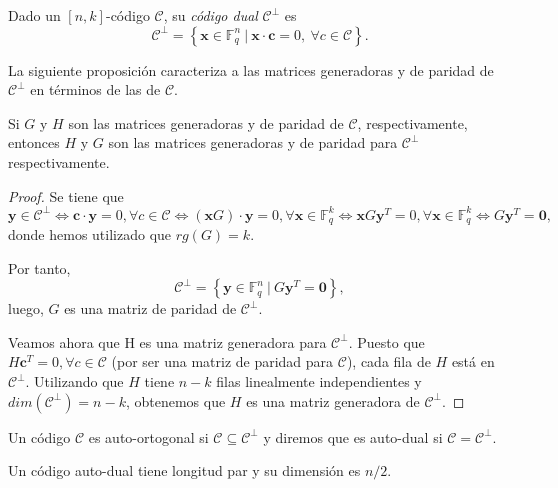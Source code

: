 \begin{definicion}
Dado un $[n,k]$-código $\mathcal{C}$, su \emph{código dual} $\mathcal{C}^{\bot}$ es
$$\mathcal{C}^{\bot} = \left\{ \mathbf{x} \in \mathds{F}_{q}^{n} \ \vert \ \mathbf{x} \cdot \mathbf{c} = 0, \ \forall c \in \mathcal{C} \right\}. $$ 
\end{definicion}

La siguiente proposición caracteriza a las matrices generadoras y de paridad de $\mathcal{C}^{\bot}$ en términos de las de $\mathcal{C}$.

\begin{proposicion}
Si $G$ y $H$ son las matrices generadoras y de paridad de $\mathcal{C}$, respectivamente, entonces $H$ y $G$ son las matrices generadoras y de paridad para $\mathcal{C}^{\bot}$ respectivamente.
\end{proposicion}

\begin{proof}
Se tiene que $$\mathbf{y} \in \mathcal{C}^{\bot} \Leftrightarrow  \mathbf{c} \cdot \mathbf{y} = 0, \forall c \in \mathcal{C} 
\Leftrightarrow (\mathbf{x}G) \cdot \mathbf{y} = 0, \forall \mathbf{x} \in \mathds{F}_{q}^{k} \Leftrightarrow \mathbf{x}G\mathbf{y}^T = 0, \forall \mathbf{x} \in \mathds{F}_{q}^{k} \Leftrightarrow G\mathbf{y}^T = \mathbf{0},$$ donde hemos utilizado que $rg(G) = k$.

Por tanto, $$\mathcal{C}^{\bot} = \left\{ \mathbf{y} \in \mathds{F}_{q}^{n} \ \vert \ G\mathbf{y}^T=\mathbf{0} \right\},$$ luego, $G$ es una matriz de paridad de $\mathcal{C}^{\bot}$.

Veamos ahora que H es una matriz generadora para $\mathcal{C}^{\bot}$. Puesto que $H\mathbf{c}^T = 0,  \forall c \in \mathcal{C}$ (por ser una matriz de paridad para $\mathcal{C}$), cada fila de $H$ está en $\mathcal{C}^{\bot}$. Utilizando que $H$ tiene $n-k$ filas linealmente independientes y $dim(\mathcal{C}^{\bot}) = n-k$, obtenemos que $H$ es una matriz generadora de $\mathcal{C}^{\bot}$.
\end{proof}

\begin{definicion}
Un código $\mathcal{C}$ es auto-ortogonal si $\mathcal{C} \subseteq \mathcal{C}^{\bot}$ y diremos que es auto-dual si $\mathcal{C} = \mathcal{C}^{\bot}$.
\end{definicion}

\begin{proposicion}
Un código auto-dual tiene longitud par y su dimensión es $n/2$.
\end{proposicion}

